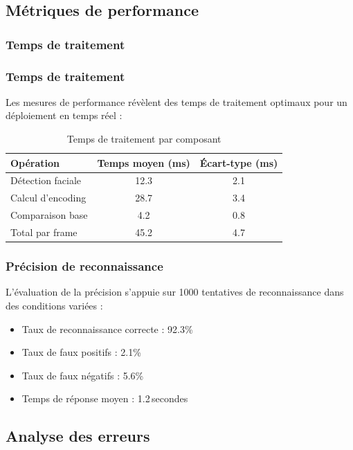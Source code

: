 \documentclass[12pt,a4paper]{article}
\begin{document}
\subsection{Métriques de performance}
\label{sec:metrics}

\subsubsection{Temps de traitement}


\subsubsection{Temps de traitement}
Les mesures de performance révèlent des temps de traitement optimaux pour un déploiement en temps réel :

\begin{table}[H]
  \centering
  \begin{tabular}{@{}lcc@{}}
    \toprule
    \textbf{Opération}       & \textbf{Temps moyen (ms)} & \textbf{Écart-type (ms)} \\
    \midrule
    Détection faciale        & 12.3  & 2.1 \\
    Calcul d’encoding        & 28.7  & 3.4 \\
    Comparaison base         & 4.2   & 0.8 \\
    Total par frame          & 45.2  & 4.7 \\
    \bottomrule
  \end{tabular}
  \caption{Temps de traitement par composant}
  \label{tab:performance}
\end{table}

\subsubsection{Précision de reconnaissance}
L'évaluation de la précision s'appuie sur 1000 tentatives de reconnaissance dans des conditions variées :
\begin{itemize}
  \item Taux de reconnaissance correcte : 92.3\%
  \item Taux de faux positifs             : 2.1\%
  \item Taux de faux négatifs             : 5.6\%
  \item Temps de réponse moyen            : 1.2 secondes
\end{itemize}

\subsection{Analyse des erreurs}
\label{sec:error-analysis}
\end{document}
